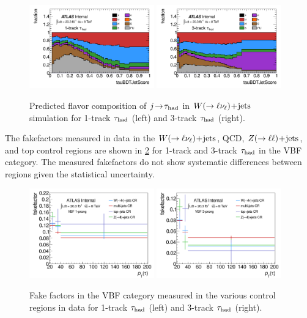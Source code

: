 \begin{figure}[tp]
  \centering
  \includegraphics[width=0.48\textwidth]{figures/backgrounds/antitau_partonflavor_1p0jSR}
  \includegraphics[width=0.48\textwidth]{figures/backgrounds/antitau_partonflavor_3p0jSR}
  \caption{Predicted flavor composition of $j\!\rightarrow\!\tau_\text{had}$ in $W (\rightarrow \ell\nu_\ell)\!+\!\text{jets}$ simulation for 1-track $\tau_\text{had}$ (left) and 3-track $\tau_\text{had}$ (right).}
  \label{fig:backgrounds-flavors}
\end{figure}

The fakefactors measured in data in the $W (\rightarrow \ell\nu_\ell)\!+\!\text{jets}$, QCD, $Z (\rightarrow \ell\ell)\!+\!\text{jets}$, and top control regions are shown in \cref{fig:backgrounds-fakefactorsVBFCRs} for 1-track and 3-track $\tau_\text{had}$ in the VBF category. The measured fakefactors do not show systematic differences between regions given the statistical uncertainty.

\begin{figure}[tp]
  \centering
  \includegraphics[width=0.48\textwidth]{figures/backgrounds/fakefactor_8TeV_vbf_1p_CRs}
  \includegraphics[width=0.48\textwidth]{figures/backgrounds/fakefactor_8TeV_vbf_3p_CRs}
  \caption{Fake factors in the VBF category measured in the various control regions in data for 1-track $\tau_\text{had}$ (left) and 3-track $\tau_\text{had}$ (right).}
  \label{fig:backgrounds-fakefactorsVBFCRs}
\end{figure}

